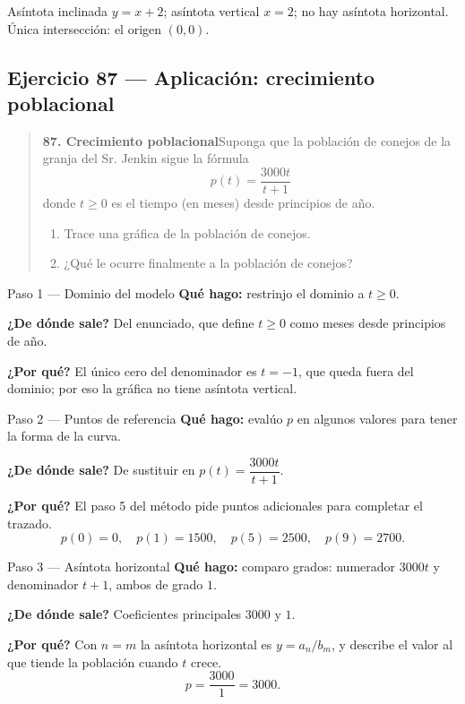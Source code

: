 \documentclass[11pt]{article}
\begin{document}
\begin{resp}
Asíntota inclinada $y=x+2$; asíntota vertical $x=2$; no hay asíntota horizontal.\\
Única intersección: el origen $(0,0)$.
\end{resp}

\subsection*{Ejercicio 87 — Aplicación: crecimiento poblacional}

\begin{quote}
\textbf{87. Crecimiento poblacional}\quad Suponga que la población de conejos de la granja del Sr. Jenkin sigue la fórmula
\[
p(t)=\frac{3000t}{t+1}
\]
donde $t\ge 0$ es el tiempo (en meses) desde principios de año.
\begin{enumerate}[label=\emph{\alph*}\,), leftmargin=*]
\item Trace una gráfica de la población de conejos.
\item ¿Qué le ocurre finalmente a la población de conejos?
\end{enumerate}
\end{quote}

\begin{paso}{Paso 1 --- Dominio del modelo}
\textbf{Qué hago:} restrinjo el dominio a $t\ge 0$.

\textbf{¿De dónde sale?} Del enunciado, que define $t\ge 0$ como meses desde principios de año.

\textbf{¿Por qué?} El único cero del denominador es $t=-1$, que queda fuera del dominio; por eso la gráfica no tiene asíntota vertical.
\end{paso}

\begin{paso}{Paso 2 --- Puntos de referencia}
\textbf{Qué hago:} evalúo $p$ en algunos valores para tener la forma de la curva.

\textbf{¿De dónde sale?} De sustituir en $p(t)=\dfrac{3000t}{t+1}$.

\textbf{¿Por qué?} El paso 5 del método pide puntos adicionales para completar el trazado.
\[
p(0)=0,\quad p(1)=1500,\quad p(5)=2500,\quad p(9)=2700 .
\]
\end{paso}

\begin{paso}{Paso 3 --- Asíntota horizontal}
\textbf{Qué hago:} comparo grados: numerador $3000t$ y denominador $t+1$, ambos de grado $1$.

\textbf{¿De dónde sale?} Coeficientes principales $3000$ y $1$.

\textbf{¿Por qué?} Con $n=m$ la asíntota horizontal es $y=a_n/b_m$, y describe el valor al que tiende la población cuando $t$ crece.
\[
p=\frac{3000}{1}=3000 .
\]
\end{paso}
\end{document}
